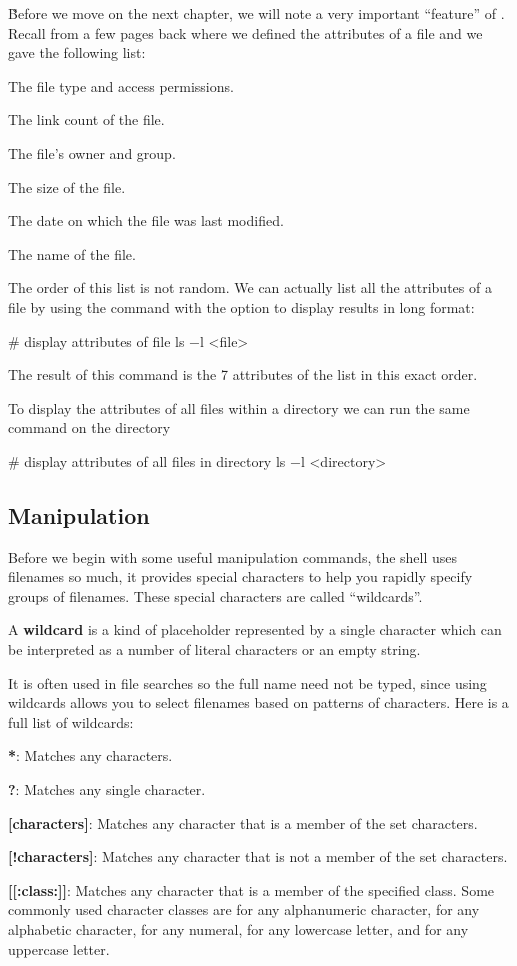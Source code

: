 \v

Before we move on the next chapter, we will note a very important ``feature'' of . Recall from a few pages back
where we defined the attributes of a file and we gave the following list:
\bit
\item The file type and access permissions.
\item The link count of the file.
\item The file's owner and group.
\item The size of the file.
\item The date on which the file was last modified.
\item The name of the file.
\eit

The order of this list is not random. We can actually list all the attributes of a file by using the  command
with the option  to display results in long format:
\begin{bash}
# display attributes of file
ls $-$l <file>
\end{bash}

The result of this command is the 7 attributes of the list in this exact order.


To display the attributes of all files within a directory we can run the same command on the directory
\begin{bash}
# display attributes of all files in directory
ls $-$l <directory>
\end{bash}

\subsection{Manipulation}

Before we begin with some useful manipulation commands, the shell uses filenames so much, it provides special
characters to help you rapidly specify groups of filenames. These special characters are called ``wildcards''.

\bd[Wildcard]
A \textbf{wildcard} is a kind of placeholder represented by a single character which can be interpreted as a number of
literal characters or an empty string.
\ed

It is often used in file searches so the full name need not be typed, since using wildcards allows you to select
filenames based on patterns of characters. Here is a full list of wildcards:
\bit
\item \textbf{*}: Matches any characters.
\item \textbf{?}: Matches any single character.
\item \textbf{[characters]}: Matches any character that is a member of the set characters.
\item \textbf{[!characters]}: Matches any character that is not a member of the set characters.
\item \textbf{[[:class:]]}: Matches any character that is a member of the specified class. Some commonly used character
classes are \code{[:alnum:]} for any alphanumeric character, \code{[:alpha:]} for any alphabetic character,
\code{[:digit:]} for any numeral, \code{[:lower:]} for any lowercase letter, and \code{[:upper:]} for any uppercase
letter.
\eit

